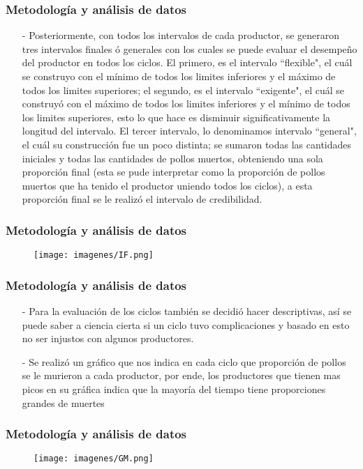 \documentclass[11pt]{beamer}
\begin{document}
\begin{frame}
\frametitle{Metodología y análisis de datos}
\begin{itemize}
\item[-]Posteriormente, con todos los intervalos de cada productor, se generaron tres intervalos finales ó generales con los cuales se puede evaluar el desempeño del productor en todos los ciclos. El primero, es el intervalo ``flexible", el cuál se construyo con el mínimo de todos los limites inferiores y el máximo de todos los limites superiores; el segundo, es el intervalo ``exigente", el cuál se construyó con el máximo de todos los limites inferiores y el mínimo de todos los limites superiores, esto lo que hace es disminuir significativamente la longitud del intervalo. El tercer intervalo, lo denominamos intervalo ``general", el cuál su construcción fue un poco distinta; se sumaron todas las cantidades iniciales y todas las cantidades de pollos muertos, obteniendo una sola proporción final (esta se pude interpretar como la proporción de pollos muertos que ha tenido el productor uniendo todos los ciclos), a esta proporción final se le realizó el intervalo de credibilidad.
\end{itemize}
\end{frame}

\begin{frame}
\frametitle{Metodología y análisis de datos}
\begin{figure}[!h]
        \texttt{[image: imagenes/IF.png]}
        \label{figura1}
\end{figure}
\end{frame}

\begin{frame}
\frametitle{Metodología y análisis de datos}
\begin{itemize}
\item[-]Para la evaluación de los ciclos también se decidió hacer descriptivas, así se puede saber a ciencia cierta si un ciclo tuvo complicaciones y basado en esto no ser injustos con algunos productores.
\item[-]Se realizó un gráfico que nos indica en cada ciclo que proporción de pollos se le murieron a cada productor, por ende, los productores que tienen mas picos en su gráfica indica que la mayoría del tiempo tiene proporciones grandes de muertes
\end{itemize}
\end{frame}

\begin{frame}
\frametitle{Metodología y análisis de datos}
\begin{figure}[!h]
        \texttt{[image: imagenes/GM.png]}
        \label{figura1}
\end{figure}
\end{frame}
\end{document}
